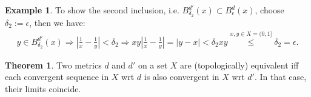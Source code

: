 \documentclass[12pt, a4paper]{article}
\numberwithin{equation}{section}
\theoremstyle{definition}
\theoremstyle{definition}
\newtheorem{exmp}[thm]{Example} %
\newtheorem{theorem}[thm]{Theorem}
\newcommand{\abs}[1]{\left\vert #1 \right\vert}
\begin{document}
\begin{exmp}
		To show the second inclusion, i.e. $B_{\delta_2}^{d'}(x) \subset B_{\epsilon}^{d}(x)$, choose $\delta_2 := \epsilon$, then we have:
		\begin{align}
			y \in B_{\delta_2}^{d'}(x) \Rightarrow \abs{\frac{1}{x} - \frac{1}{y}} < \delta_2 \Rightarrow xy\abs{\frac{1}{x} - \frac{1}{y}} = \abs{y - x} < \delta_2 xy \overset{x, y\in X = (0, 1]}{\leq} \delta_2 = \epsilon.
		\end{align}
	\end{exmp}

	\begin{theorem}
		Two metrics $d$ and $d'$ on a set $X$ are (topologically) equivalent iff each convergent sequence in $X$ wrt $d$ is also convergent in $X$ wrt $d'$. In that case, their limits coincide.
	\end{theorem}
\end{document}
